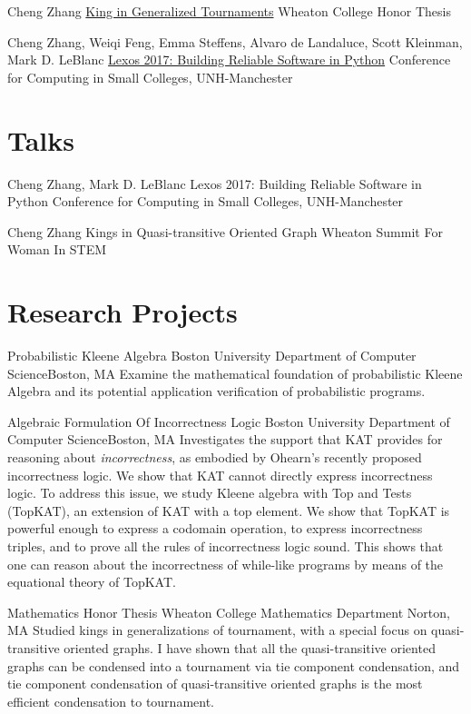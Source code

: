 \documentclass[11pt,roman]{moderncv}        %
\begin{document}
{Cheng Zhang}
{\href{http://hdl.handle.net/11040/24570}{King in Generalized Tournaments}}
{Wheaton College Honor Thesis}
{}{}

{Cheng Zhang, Weiqi Feng, Emma Steffens, Alvaro de Landaluce, Scott Kleinman, Mark D. LeBlanc}
{\href{https://dl.acm.org/doi/10.5555/3205191.3205205}{Lexos 2017: Building Reliable Software in Python}}
{Conference for Computing in Small Colleges, UNH-Manchester}
{}{}


\section{Talks}

{Cheng Zhang, Mark D. LeBlanc}
{Lexos 2017: Building Reliable Software in Python}
{Conference for Computing in Small Colleges, UNH-Manchester}
{}{}

{Cheng Zhang}
{Kings in Quasi-transitive Oriented Graph}
{Wheaton Summit For Woman In STEM}
{}{}


\section{Research Projects}

{Probabilistic Kleene Algebra}
{Boston University Department of Computer Science}{Boston, MA}{}
{Examine the mathematical foundation of probabilistic Kleene Algebra 
and its potential application verification of probabilistic programs.}

{Algebraic Formulation Of Incorrectness Logic}
{Boston University Department of Computer Science}{Boston, MA}{}
{Investigates the support that KAT provides for reasoning about \emph{incorrectness}, 
as embodied by Ohearn's recently proposed incorrectness logic. 
We show that KAT cannot directly express incorrectness logic. 
To address this issue, we study Kleene algebra with Top and Tests (TopKAT), 
an extension of KAT with a top element. 
We show that TopKAT is powerful enough to express a codomain operation, 
to express incorrectness triples, 
and to prove all the rules of incorrectness logic sound. 
This shows that one can reason about the incorrectness of while-like programs 
by means of the equational theory of TopKAT\@. }

{Mathematics Honor Thesis}
{Wheaton College Mathematics Department}
{Norton, MA}{}
{Studied kings in generalizations of tournament,
with a special focus on quasi-transitive oriented graphs.
I have shown that all the quasi-transitive oriented graphs
can be condensed into a tournament via tie component condensation, 
and tie component condensation of quasi-transitive 
oriented graphs is the most efficient condensation to tournament.
}
\end{document}
